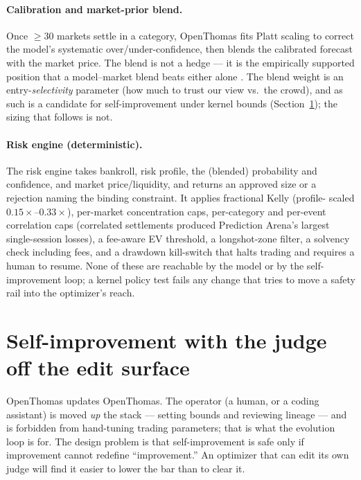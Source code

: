 \documentclass[sigconf,review,anonymous]{acmart}
\begin{document}
\paragraph{Calibration and market-prior blend.}
Once $\geq 30$ markets settle in a category, OpenThomas fits Platt scaling to
correct the model's systematic over/under-confidence, then blends the calibrated
forecast with the market price. The blend is not a hedge --- it is the empirically
supported position that a model--market blend beats either alone \cite{blend}. The
blend weight is an entry-\emph{selectivity} parameter (how much to trust our view
vs.\ the crowd), and as such is a candidate for self-improvement under kernel
bounds (Section~\ref{sec:rsi}); the sizing that follows is not.

\paragraph{Risk engine (deterministic).}
The risk engine takes bankroll, risk profile, the (blended) probability and
confidence, and market price/liquidity, and returns an approved size or a
rejection naming the binding constraint. It applies fractional Kelly (profile-
scaled $0.15\times$--$0.33\times$), per-market concentration caps, per-category
and per-event correlation caps (correlated settlements produced Prediction
Arena's largest single-session losses), a fee-aware EV threshold, a longshot-zone
filter, a solvency check including fees, and a drawdown kill-switch that halts
trading and requires a human to resume. None of these are reachable by the model
or by the self-improvement loop; a kernel policy test fails any change that tries
to move a safety rail into the optimizer's reach.

\section{Self-improvement with the judge off the edit surface}
\label{sec:rsi}

OpenThomas updates OpenThomas. The operator (a human, or a coding assistant) is
moved \emph{up} the stack --- setting bounds and reviewing lineage --- and is
forbidden from hand-tuning trading parameters; that is what the evolution loop is
for. The design problem is that self-improvement is safe only if improvement
cannot redefine ``improvement.'' An optimizer that can edit its own judge will
find it easier to lower the bar than to clear it.
\end{document}
